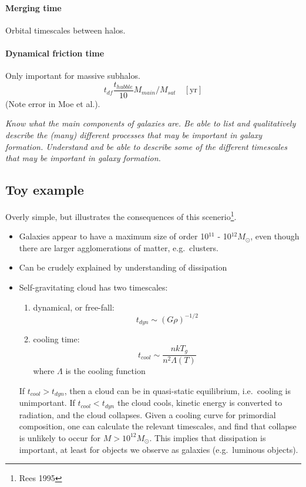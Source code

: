 \documentclass{article}
\newcommand{\test}[1]{%
    \begin{center}
        \colorbox{hl}{\parbox{0.9\textwidth}{\emph{\centering #1}}}
    \end{center}}
\begin{document}
\paragraph{Merging time}
Orbital timescales between halos.

\paragraph{Dynamical friction time}
Only important for massive subhalos.
\[
    t_{df} \frac{t_{hubble}}{10} M_{main}/M_{sat}\quad [\mathrm{yr}]
    \]
(Note error in Moe et al.).

\test{Know what the main components of galaxies are. Be able to list and qualitatively
describe the (many) different processes that may be important in galaxy formation.
Understand and be able to describe some of the different timescales that may be
important in galaxy formation.}

\subsection{Toy example}
Overly simple, but illustrates the consequences of this scenerio\footnote{
Rees 1995}.
\begin{itemize}
    \item Galaxies appear to have a maximum size of order
        10$^{11}$ - 10$^{12} M_{\odot}$, even though there are larger
        agglomerations of matter, e.g.\ clusters.
    \item Can be crudely explained by understanding of dissipation
    \item Self-gravitating cloud has two timescales:
        \begin{enumerate}
            \item dynamical, or free-fall:
                \[
                    t_{dyn} \sim (G\rho)^{-1/2}
                \]
            \item cooling time:
                \[
                    t_{cool} \sim \frac{nkT_{g}}{n^{2}\Lambda(T)}
                \]
                where $\Lambda$ is the cooling function
        \end{enumerate}
        If $t_{cool} > t_{dyn}$, then a cloud can be in quasi-static
        equilibrium, i.e.\ cooling is unimportant. If $t_{cool} < t_{dyn}$
        the cloud cools, kinetic energy is converted to radiation, and
        the cloud collapses. Given a cooling curve for primordial
        composition, one can calculate the relevant timescales, and find
        that collapse is unlikely to occur for $M>10^{12}M_{\odot}$.
        This implies that dissipation is important, at least for
        objects we observe as galaxies (e.g.\ luminous objects).
\end{itemize}
\end{document}
